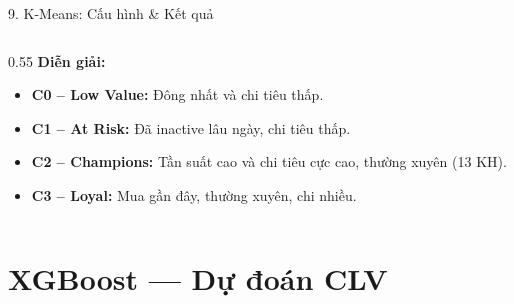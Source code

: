 \documentclass[10pt, aspectratio=169]{beamer}
\begin{document}
\begin{frame}{9. K-Means: Cấu hình \& Kết quả}
\begin{columns}[T]
\begin{column}{0.55\textwidth}
            \small
            \vspace{0.15cm}
            \textbf{Diễn giải:}
            \begin{itemize}
                \item \textbf{C0 -- Low Value:} Đông nhất và chi tiêu thấp.
                \item \textbf{C1 -- At Risk:} Đã inactive lâu ngày, chi tiêu thấp.
                \item \textbf{C2 -- Champions:} Tần suất cao và chi tiêu cực cao, thường xuyên (13 KH).
                \item \textbf{C3 -- Loyal:} Mua gần đây, thường xuyên, chi nhiều.
            \end{itemize}
        \end{column}
    \end{columns}
\end{frame}

\section{XGBoost --- Dự đoán CLV}
\end{document}
